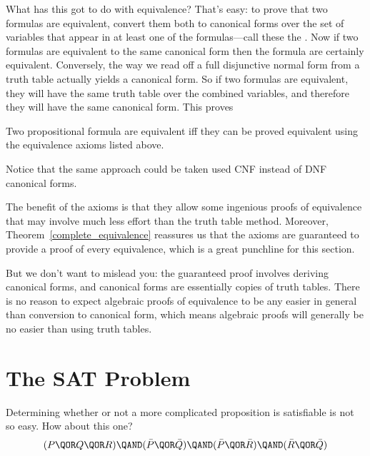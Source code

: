 What has this got to do with equivalence?  That's easy: to prove that
two formulas are equivalent, convert them both to canonical forms over
the set of variables that appear in at least one of the
formulas---call these the .  Now if two
formulas are equivalent to the same canonical form then the formula
are certainly equivalent.  Conversely, the way we read off a full
disjunctive normal form from a truth table actually yields a canonical
form.  So if two formulas are equivalent, they will have the same
truth table over the combined variables, and therefore they will have
the same canonical form.  This proves
\begin{theorem}
\label{complete_equivalence}
Two propositional formula are equivalent iff they can be proved
equivalent using the equivalence axioms listed above.
\end{theorem}

Notice that the same approach could be taken used CNF instead of DNF
canonical forms.

The benefit of the axioms is that they allow some ingenious proofs of
equivalence that may involve much less effort than the truth table
method.  Moreover, Theorem~\ref{complete_equivalence} reassures us
that the axioms are guaranteed to provide a proof of every
equivalence, which is a great punchline for this section.

But we don't want to mislead you: the guaranteed proof involves
deriving canonical forms, and canonical forms are essentially copies
of truth tables.  There is no reason to expect algebraic proofs of
equivalence to be any easier in general than conversion to canonical
form, which means algebraic proofs will generally be no easier than
using truth tables.

\begin{problems}
\practiceproblems
{}

\classproblems
{}

\homeworkproblems
{}
\end{problems}

\section{The SAT Problem}\label{SAT_sec}
Determining whether or not a more complicated proposition is
satisfiable is not so easy.  How about this one?
\[
(P \QOR Q \QOR R) \QAND (\bar P \QOR \bar Q)
                  \QAND (\bar P \QOR \bar R)
                  \QAND (\bar R \QOR \bar Q)
\]


